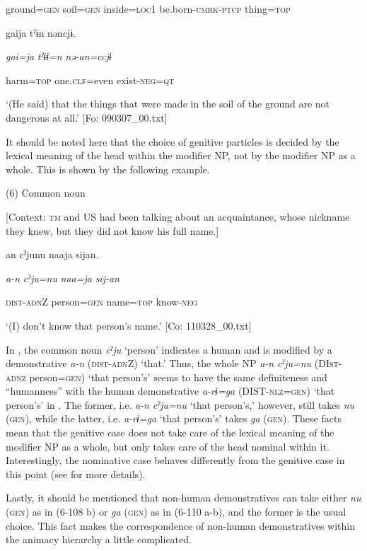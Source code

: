       ground=\textsc{gen}  soil=\textsc{gen}  inside=\textsc{loc}1  be.born-\textsc{umrk}-\textsc{ptcp}  thing=\textsc{top}

      gaija  tˀɨn  nəncjɨ.

      \textit{gai=ja}  \textit{tˀɨɨ=n}  \textit{nə-an=ccjɨ}

      harm=\textsc{top}  one.\textsc{clf}=even  exist-\textsc{neg}=\textsc{qt}

\glt ‘(He said) that the things that were made in the soil of the ground are not dangerous at all.’ [Fo: 090307\_00.txt]
\z

It should be noted here that the choice of genitive particles is decided by the lexical meaning of the head within the modifier NP, not by the modifier NP as a whole. This is shown by the following example.

(6)  Common noun

  [Context: \textsc{tm} and US had been talking about an acquaintance, whose nickname they knew, but they did not know his full name.]

{\TM}
\gll an  cˀjunu  naaja  sijan.

    \textit{a-n}  \textit{cˀju=nu}  \textit{naa=ja}  \textit{sij-an}

    \textsc{dist}-\textsc{adn}Z  person=\textsc{gen}  name=\textsc{top}  know-\textsc{neg}

\glt    ‘(I) don’t know that person’s name.’ [Co: 110328\_00.txt]
\z

In , the common noun \textit{cˀju} ‘person’ indicates a human and is modified by a demonstrative \textit{a-n} (\textsc{dist}-\textsc{adn}Z) ‘that.’ Thus, the whole NP \textit{a-n} \textit{cˀju=nu} (DI\textsc{st}-\textsc{adnz} person=\textsc{gen}) ‘that person’s’ seems to have the same definiteness and “humanness” with the human demonstrative \textit{a-rɨ=ga} (DIST-\textsc{nlz}=\textsc{gen}) ‘that person’s’ in . The former, i.e. \textit{a-n} \textit{cˀju=nu} ‘that person’s,’ however, still takes \textit{nu} (\textsc{gen}), while the latter, i.e. \textit{a-rɨ=ga} ‘that person’s’ takes \textit{ga} (\textsc{gen}). These facts mean that the genitive case does not take care of the lexical meaning of the modifier NP as a whole, but only takes care of the head nominal within it. Interestingly, the nominative case behaves differently from the genitive case in this point (see  for more details).

  Lastly, it should be mentioned that non-human demonstratives can take either \textit{nu} (\textsc{gen}) as in (6-108 b) or \textit{ga} (\textsc{gen}) as in (6-110 a-b), and the former is the usual choice. This fact makes the correspondence of non-human demonstratives within the animacy hierarchy a little complicated.

